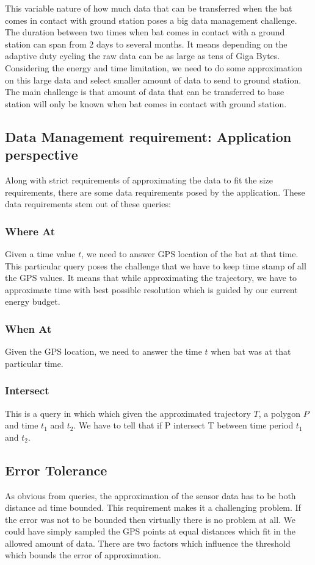 \documentclass[conference]{IEEEtran}
\begin{document}
This variable nature of how much data that can be transferred when the bat comes in contact with ground station poses a big data management challenge. The duration between two times when bat comes in contact with a ground station can span from 2 days to several months\cite{raja-ipsn}. It means depending on the adaptive duty cycling the raw data can be as large as tens of Giga Bytes. Considering the energy and time limitation, we need to do some approximation on this large data and select smaller amount of data to send to ground station. The main challenge is that amount of data that can be transferred to base station will only be known when bat comes in contact with ground station.\

\subsection{Data Management requirement: Application perspective}
Along with strict requirements of approximating the data to fit the size requirements, there are some data requirements posed by the application. These data requirements stem out of these queries:
\subsubsection{Where At}
Given a time value $t$, we need to answer GPS location of the bat at that time. This particular query poses the challenge that we have to keep time stamp of all the GPS values. It means that while approximating the trajectory, we have to approximate time with best possible resolution which is guided by our current energy budget.
\subsubsection{When At}
Given the GPS location, we need to answer the time $t$ when bat was at that particular time. 
\subsubsection{Intersect}
This is a query in which which given the approximated trajectory $T$, a polygon $P$ and time $t_1$ and $t_2$. We have to tell that if P intersect T between time period $t_1$ and $t_2$.
\subsection{Error Tolerance}
As obvious from queries, the approximation of the sensor data has to be both distance ad time bounded. 
This requirement makes it a challenging problem. If the error was not to be bounded then virtually there is no problem at all. We could have simply sampled the GPS points at equal distances which fit in the allowed amount of data. There are two factors which influence the threshold which bounds the error of approximation.\
\end{document}
